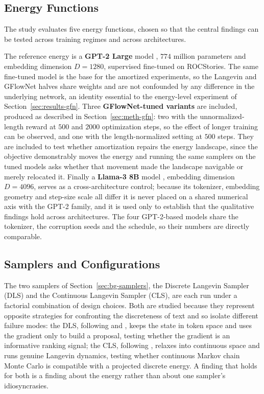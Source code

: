 \subsection{Energy Functions}
\label{sec:meth-models}

The study evaluates five energy functions, chosen so that the central findings can be tested across training regimes and across architectures.

The reference energy is a \textbf{GPT-2 Large} model \citep{radford2019language}, $774$ million parameters and embedding dimension $D = 1280$, supervised fine-tuned on ROCStories. The same fine-tuned model is the base for the amortized experiments, so the Langevin and GFlowNet halves share weights and are not confounded by any difference in the underlying network, an identity essential to the energy-level experiment of Section~\ref{sec:results-gfn}. Three \textbf{GFlowNet-tuned variants} are included, produced as described in Section~\ref{sec:meth-gfn}: two with the unnormalized-length reward at $500$ and $2000$ optimization steps, so the effect of longer training can be observed, and one with the length-normalized setting at $500$ steps. They are included to test whether amortization repairs the energy landscape, since the objective demonstrably moves the energy and running the same samplers on the tuned models asks whether that movement made the landscape navigable or merely relocated it. Finally a \textbf{Llama-3 8B} model \citep{dubey2024llama}, embedding dimension $D = 4096$, serves as a cross-architecture control; because its tokenizer, embedding geometry and step-size scale all differ it is never placed on a shared numerical axis with the GPT-2 family, and it is used only to establish that the qualitative findings hold across architectures. The four GPT-2-based models share the tokenizer, the corruption seeds and the schedule, so their numbers are directly comparable.

\subsection{Samplers and Configurations}
\label{sec:meth-configs}

The two samplers of Section~\ref{sec:bg-samplers}, the Discrete Langevin Sampler (DLS) and the Continuous Langevin Sampler (CLS), are each run under a factorial combination of design choices. Both are studied because they represent opposite strategies for confronting the discreteness of text and so isolate different failure modes: the DLS, following \citet{grathwohl2021oops} and \citet{zhang2022langevin}, keeps the state in token space and uses the gradient only to build a proposal, testing whether the gradient is an informative ranking signal; the CLS, following \citet{kumar2022gradient}, relaxes into continuous space and runs genuine Langevin dynamics, testing whether continuous Markov chain Monte Carlo is compatible with a projected discrete energy. A finding that holds for both is a finding about the energy rather than about one sampler's idiosyncrasies.

